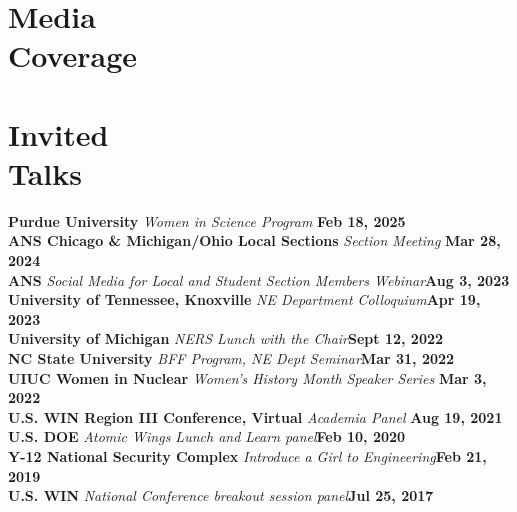 \documentclass[margin,line]{resume}
\begin{document}
\begin{resume}
    \section{\mysidestyle Media\\Coverage}
    \begin{bibenum}
        \item {}
        \item {}
        \item {}
        \item {}
        \item {}
        \item {}
        \item {}
        \item {}
    \end{bibenum}
    \section{\mysidestyle Invited\\Talks}
    \textbf{Purdue University} \textsl{Women in Science Program} \hfill \textbf{Feb 18, 2025}\\ 
    \textbf{ANS Chicago \& Michigan/Ohio Local Sections} \textsl{Section Meeting} \hfill\textbf{Mar 28, 2024}\\
    \textbf{ANS} \textsl{Social Media for Local and Student Section Members Webinar}\hfill \textbf{Aug 3, 2023}\\
    \textbf{University of Tennessee, Knoxville} \textsl{NE Department Colloquium}\hfill \textbf{Apr 19, 2023}\\
    \textbf{University of Michigan} \textsl{NERS Lunch with the Chair}\hfill \textbf{Sept 12, 2022}\\
    \textbf{NC State University} \textsl{BFF Program, NE Dept Seminar}\hfill\textbf{Mar 31, 2022}\\
    \textbf{UIUC Women in Nuclear} \textsl{Women's History Month Speaker Series} \hfill\textbf{Mar 3, 2022}\\
    \textbf{U.S. WIN Region III Conference, Virtual} \textsl{Academia Panel} \hfill \textbf{Aug 19, 2021}\\
    \textbf{U.S. DOE} \textsl{Atomic Wings Lunch and Learn panel}\hfill \textbf{Feb 10, 2020} \\
    \textbf{Y-12 National Security Complex} \textsl{Introduce a Girl to Engineering}\hfill \textbf{Feb 21, 2019} \\
    \textbf{U.S. WIN} \textsl{National Conference breakout session panel}\hfill \textbf{Jul 25, 2017}

\end{resume}
\end{document}
